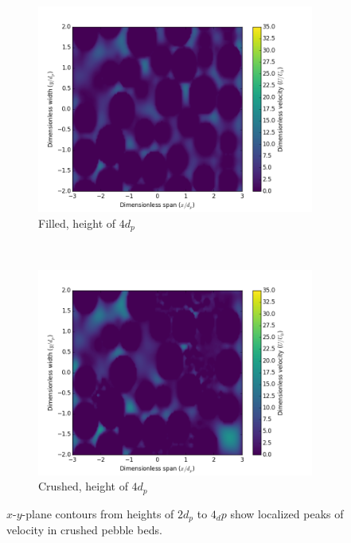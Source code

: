 \begin{figure}[!ht]
    \begin{subfigure}[b]{0.44\textwidth}
        \includegraphics[width = \textwidth]{figures/lbm/cross-sections-filled/contour-80}
        \caption{Filled, height of $4d_p$}\label{fig:lbm-contours-filled-80}
    \end{subfigure}
    ~
    \begin{subfigure}[b]{0.44\textwidth}
        \includegraphics[width = \textwidth]{figures/lbm/cross-sections-crushed/contour-80}
        \caption{Crushed, height of $4d_p$}\label{fig:lbm-contours-crushed-80}
    \end{subfigure}
    \caption{$x$-$y$-plane contours from heights of $2d_p$ to $4_dp$ show localized peaks of velocity in crushed pebble beds.}\label{fig:lbm-contours-40-80}
\end{figure}



